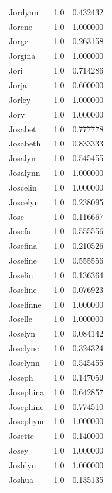 \documentclass[
  letterpaper,
  DIV=11,
  numbers=noendperiod]{scrreprt}
\begin{document}
\begin{tabular}{lrr}
Jordynn         &   1.0 &   0.432432 \\
Jorene          &   1.0 &   1.000000 \\
Jorge           &   1.0 &   0.263158 \\
Jorgina         &   1.0 &   1.000000 \\
Jori            &   1.0 &   0.714286 \\
Jorja           &   1.0 &   0.600000 \\
Jorley          &   1.0 &   1.000000 \\
Jory            &   1.0 &   1.000000 \\
Josabet         &   1.0 &   0.777778 \\
Josabeth        &   1.0 &   0.833333 \\
Josalyn         &   1.0 &   0.545455 \\
Josalynn        &   1.0 &   1.000000 \\
Joscelin        &   1.0 &   1.000000 \\
Joscelyn        &   1.0 &   0.238095 \\
Jose            &   1.0 &   0.116667 \\
Josefa          &   1.0 &   0.555556 \\
Josefina        &   1.0 &   0.210526 \\
Josefine        &   1.0 &   0.555556 \\
Joselin         &   1.0 &   0.136364 \\
Joseline        &   1.0 &   0.076923 \\
Joselinne       &   1.0 &   1.000000 \\
Joselle         &   1.0 &   1.000000 \\
Joselyn         &   1.0 &   0.084142 \\
Joselyne        &   1.0 &   0.324324 \\
Joselynn        &   1.0 &   0.545455 \\
Joseph          &   1.0 &   0.147059 \\
Josephina       &   1.0 &   0.642857 \\
Josephine       &   1.0 &   0.774510 \\
Josephyne       &   1.0 &   1.000000 \\
Josette         &   1.0 &   0.140000 \\
Josey           &   1.0 &   1.000000 \\
Joshlyn         &   1.0 &   1.000000 \\
Joshua          &   1.0 &   0.135135 \\

\end{tabular}
\end{document}
